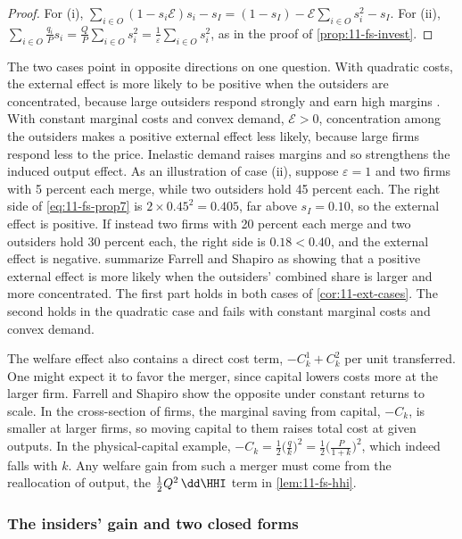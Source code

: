 \begin{proof}
For (i), $\sum_{i \in O}(1 - s_i\mathcal{E})s_i - s_I = (1 - s_I) - \mathcal{E}\sum_{i \in O}s_i^2 - s_I$. For (ii),
$\sum_{i \in O}\frac{q_i}{P}s_i = \frac{Q}{P}\sum_{i \in O}s_i^2 = \frac{1}{\varepsilon}\sum_{i \in O}s_i^2$, as in
the proof of \cref{prop:11-fs-invest}.
\end{proof}

The two cases point in opposite directions on one question. With quadratic costs, the external effect is more
likely to be positive when the outsiders are concentrated, because large outsiders respond strongly and earn high
margins \citep[Proposition 7]{FarrellShapiro1988}. With constant marginal costs and convex demand,
$\mathcal{E} > 0$, concentration among the outsiders makes a positive external effect less likely, because large
firms respond less to the price. Inelastic demand raises margins and so strengthens the induced output effect.
As an illustration of case (ii), suppose $\varepsilon = 1$ and two firms with 5 percent each merge, while two
outsiders hold 45 percent each. The right side of \eqref{eq:11-fs-prop7} is $2 \times 0.45^2 = 0.405$, far above
$s_I = 0.10$, so the external effect is positive. If instead two firms with 20 percent each merge and two outsiders
hold 30 percent each, the right side is $0.18 < 0.40$, and the external effect is negative.
\citet[p.~230]{AskerNocke2021} summarize Farrell and Shapiro as showing that a positive external effect is more
likely when the outsiders' combined share is larger and more concentrated. The first part holds in both cases of
\cref{cor:11-ext-cases}. The second holds in the quadratic case and fails with constant marginal costs and convex
demand.

The welfare effect also contains a direct cost term, $-C^1_k + C^2_k$ per unit transferred. One might expect it
to favor the merger, since capital lowers costs more at the larger firm. Farrell and Shapiro show the opposite
under constant returns to scale. In the cross-section of firms, the marginal saving from capital, $-C_k$, is
smaller at larger firms, so moving capital to them raises total cost at given outputs. In the physical-capital
example, $-C_k = \frac{1}{2}\big(\frac{q}{k}\big)^2 = \frac{1}{2}\big(\frac{P}{1 + k}\big)^2$, which indeed falls
with $k$. Any welfare gain from such a merger must come from the reallocation of output, the
$\frac{1}{2}Q^2\,\dd\HHI$ term in \cref{lem:11-fs-hhi}.

\subsubsection{The insiders' gain and two closed forms}

